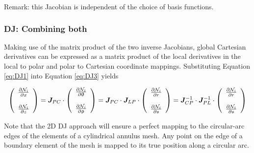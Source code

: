 Remark: this Jacobian is independent of the choice of basis functions.


\subsubsection{DJ: Combining both}

Making use of the matrix product of the two inverse Jacobians,
global Cartesian derivatives can be expressed as a matrix product of the local derivatives in the local to polar and polar to Cartesian coordinate mappings. Substituting Equation \eqref{eq:DJ1} into Equation \eqref{eq:DJ3} yields

\[
\left(
\begin{array}{c}
\frac{\partial {\mathcal{N}}_i}{\partial x} \\ \\
\frac{\partial {\mathcal{N}}_i}{\partial z} 
\end{array}
\right)
= 
{\bm J}_{PC} \cdot 
\left(
\begin{array}{c}
\frac{\partial {\mathcal{N}}_i}{\partial \uptheta} \\ \\
\frac{\partial {\mathcal{N}}_i}{\partial \uprho} 
\end{array}
\right)
=
{\bm J}_{PC} \cdot 
{\bm J}_{LP} \cdot 
\left(
\begin{array}{c}
\frac{\partial {\mathcal{N}}_i}{\partial r} \\ \\
\frac{\partial {\mathcal{N}}_i}{\partial s} 
\end{array}
\right)
=
{\bm J}_{CP}^{-1} \cdot 
{\bm J}_{PL}^{-1} \cdot 
\left(
\begin{array}{c}
\frac{\partial {\mathcal{N}}_i}{\partial r} \\ \\
\frac{\partial {\mathcal{N}}_i}{\partial s} 
\end{array}
\right)
\]

Note that the 2D DJ approach will ensure a perfect mapping to the circular-arc edges of the 
elements of a cylindrical annulus mesh.
Any point on the edge of a boundary element of the mesh is mapped to its true position along 
a circular arc.

